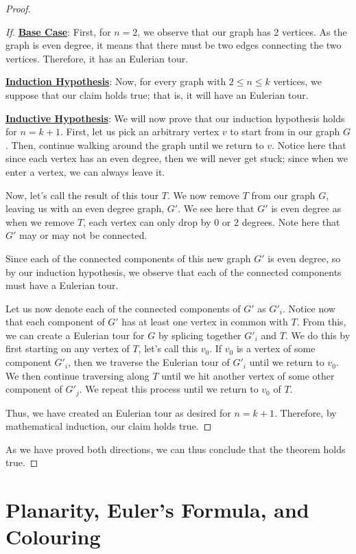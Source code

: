\documentclass[openany]{book}
\begin{document}
\begin{proof}
\begin{proof}[If]
		\textbf{\underline{Base Case}}: First, for $n=2$, we observe that our graph has $2$ vertices. As the graph is even degree, it means that there must be two edges connecting the two vertices. Therefore, it has an Eulerian tour.
		
		\textbf{\underline{Induction Hypothesis}}: Now, for every graph with $2 \leq n \leq k$ vertices, we suppose that our claim holds true; that is, it will have an Eulerian tour.
		
		\textbf{\underline{Inductive Hypothesis}}: We will now prove that our induction hypothesis holds for $n=k+1$. First, let us pick an arbitrary vertex $v$ to start from in our graph $G$. Then, continue walking around the graph until we return to $v$. Notice here that since each vertex has an even degree, then we will never get stuck; since when we enter a vertex, we can always leave it.
		
		Now, let's call the result of this tour $T$. We now remove $T$ from our graph $G$, leaving us with an even degree graph, $G'$. We see here that $G'$ is even degree as when we remove $T$, each vertex can only drop by $0$ or $2$ degrees. Note here that $G'$ may or may not be connected.
		
		Since each of the connected components of this new graph $G'$ is even degree, so by our induction hypothesis, we observe that each of the connected components must have a Eulerian tour.
		
		Let us now denote each of the connected components of $G'$ as $G'_{i}$. Notice now that each component of $G'$ has at least one vertex in common with $T$. From this, we can create a Eulerian tour for $G$ by splicing together $G'_{i}$ and $T$. We do this by first starting on any vertex of $T$, let's call this $v_{0}$. If $v_{0}$ is a vertex of some component $G'_{i}$, then we traverse the Eulerian tour of $G'_{i}$ until we return to $v_{0}$. We then continue traversing along $T$ until we hit another vertex of some other component of $G'_{j}$. We repeat this process until we return to $v_{0}$ of $T$.
		
		Thus, we have created an Eulerian tour as desired for $n=k+1$. Therefore, by mathematical induction, our claim holds true.
	\end{proof}

	As we have proved both directions, we can thus conclude that the theorem holds true.
\end{proof}

\section{Planarity, Euler's Formula, and Colouring}
\end{document}
